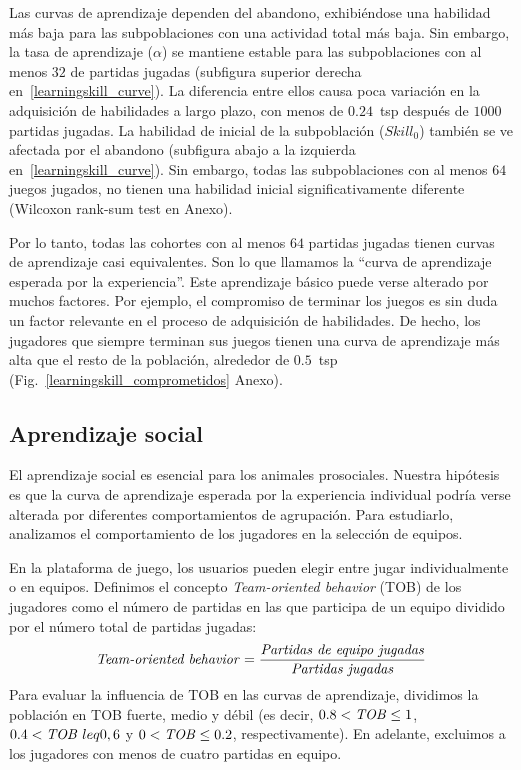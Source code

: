 \documentclass[a4paper,11pt]{book}
\theoremstyle{definition}
\begin{document}

Las curvas de aprendizaje dependen del abandono, exhibiéndose una habilidad más baja para las subpoblaciones con una actividad total más baja.
%
Sin embargo, la tasa de aprendizaje ($\alpha$) se mantiene estable para las subpoblaciones con al menos $32$ de partidas jugadas (subfigura superior derecha en~\ref{learningskill_curve}).
%
La diferencia entre ellos causa poca variación en la adquisición de habilidades a largo plazo, con menos de $0.24$~tsp después de $1000$ partidas jugadas.
%
La habilidad de inicial de la subpoblación ($Skill_0$) también se ve afectada por el abandono (subfigura abajo a la izquierda en~\ref{learningskill_curve}).
%
Sin embargo, todas las subpoblaciones con al menos $64$ juegos jugados, no tienen una habilidad inicial significativamente diferente (Wilcoxon rank-sum test en Anexo).


Por lo tanto, todas las cohortes con al menos $64$ partidas jugadas tienen curvas de aprendizaje casi equivalentes.
%
Son lo que llamamos la ``curva de aprendizaje esperada por la experiencia''.
%
Este aprendizaje básico puede verse alterado por muchos factores.
%
Por ejemplo, el compromiso de terminar los juegos es sin duda un factor relevante en el proceso de adquisición de habilidades.
%
De hecho, los jugadores que siempre terminan sus juegos tienen una curva de aprendizaje más alta que el resto de la población, alrededor de $0.5$~tsp (Fig.~\ref{learningskill_comprometidos} Anexo).

\subsection{Aprendizaje social}

El aprendizaje social es esencial para los animales prosociales.
%
Nuestra hipótesis es que la curva de aprendizaje esperada por la experiencia individual podría verse alterada por diferentes comportamientos de agrupación.
%
Para estudiarlo, analizamos el comportamiento de los jugadores en la selección de equipos.


En la plataforma de juego, los usuarios pueden elegir entre jugar individualmente o en equipos.
%
Definimos el concepto \emph{Team-oriented behavior} (TOB) de los jugadores como el número de partidas en las que participa de un equipo dividido por el número total de partidas jugadas:
%
\begin{equation}
\text{\emph{Team-oriented behavior}} = \frac{\text{\emph{Partidas de equipo jugadas}}}{\text{\emph{Partidas jugadas}}}
\end{equation}
%
Para evaluar la influencia de TOB en las curvas de aprendizaje, dividimos la población en TOB fuerte, medio y débil (es decir, $0.8<\text{\emph{TOB}}\leq 1$, $0.4 <\text{\emph{TOB}}\ leq 0,6$ y $0 <\text{\emph{TOB}}\leq 0.2$, respectivamente).
%
En adelante, excluimos a los jugadores con menos de cuatro partidas en equipo.
\end{document}
